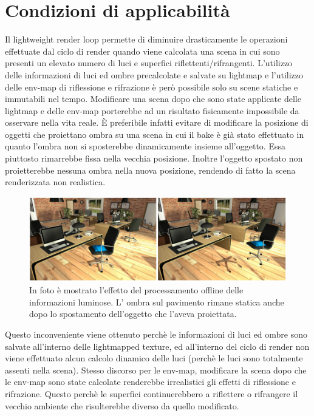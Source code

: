 \section{Condizioni di applicabilità}
\label{sec:chapter_lrl_cond_app}

Il lightweight render loop permette di diminuire drasticamente le operazioni effettuate dal ciclo di render quando viene calcolata una scena in cui sono presenti un elevato numero di luci e superfici riflettenti/rifrangenti. 
L’utilizzo delle informazioni di luci ed ombre precalcolate e salvate su lightmap e l’utilizzo delle env-map di riflessione e rifrazione è però possibile solo su scene statiche e immutabili nel tempo.
Modificare una scena dopo che sono state applicate delle lightmap e delle env-map porterebbe ad un risultato fisicamente impossibile da osservare nella vita reale. 
È preferibile infatti evitare di modificare la posizione di oggetti che proiettano ombra su una scena in cui il bake è già stato effettuato in quanto l’ombra non si sposterebbe dinamicamente insieme all’oggetto. Essa piuttosto rimarrebbe fissa nella vecchia posizione. 
Inoltre l’oggetto spostato non proietterebbe nessuna ombra nella nuova posizione, rendendo di fatto la scena renderizzata non realistica. 
\\
\begin{figure}[htb]
 \centering
 \includegraphics[width=1\linewidth]{images/chapter_lrl/lrl_appl1.png}\hfill
 \caption[Applicabilità, ombre statiche]{In foto è mostrato l'effetto del processamento offline delle informazioni luminose. L' ombra sul pavimento rimane statica anche dopo lo spostamento dell'oggetto che l'aveva proiettata.}
 \label{fig:lrl_appl1}
\end{figure}
Questo inconveniente viene ottenuto perchè le informazioni di luci ed ombre sono salvate all’interno delle lightmapped texture, ed all’interno del ciclo di render non viene effettuato alcun calcolo dinamico delle luci  (perchè le luci sono totalmente assenti nella scena).
Stesso discorso per le env-map, modificare la scena dopo che le env-map sono state calcolate renderebbe irrealistici gli effetti di riflessione e rifrazione. Questo perchè le superfici continuerebbero a riflettere o rifrangere  il vecchio ambiente che risulterebbe diverso da quello modificato.

